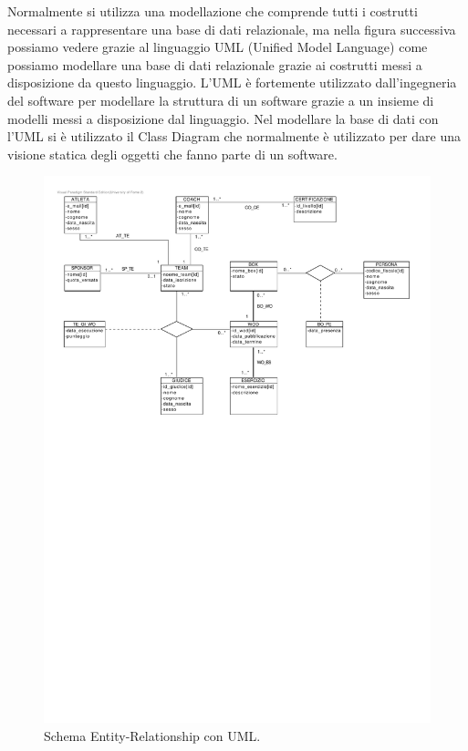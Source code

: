 \documentclass[12pt,a4paper]{article}
\begin{document}
\newpage
Normalmente si utilizza una modellazione che comprende tutti i costrutti necessari a rappresentare una base di dati relazionale, ma nella figura successiva possiamo vedere grazie al linguaggio UML (Unified Model Language) come possiamo modellare una base di dati relazionale grazie ai costrutti messi a disposizione da questo linguaggio. L'UML è fortemente utilizzato dall'ingegneria del software per modellare la struttura di un software grazie a un insieme di modelli messi a disposizione dal linguaggio. Nel modellare la base di dati con l'UML si è utilizzato il Class Diagram che normalmente è utilizzato per dare una visione statica degli oggetti che fanno parte di un software.
\begin{figure}
    \centering
    \caption[Entity Relationship UMLumlschemaer]{Schema Entity-Relationship con UML.}
    \includegraphics[width=\textwidth]{umlschemaer}
\end{figure}
\newpage
\end{document}
